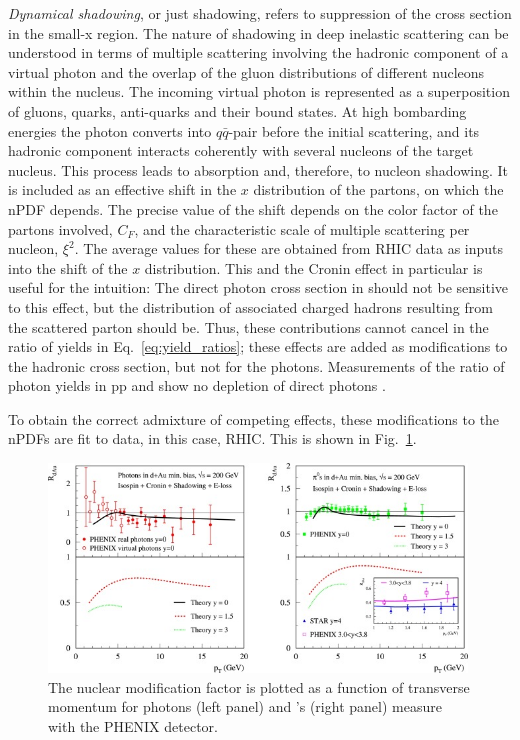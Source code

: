 {\textit{Dynamical shadowing}, or just shadowing, refers to suppression of the cross section in the small-x region. The nature of shadowing in deep inelastic scattering can be understood in terms of multiple scattering involving the hadronic component of a virtual photon and the overlap of the gluon distributions of different nucleons within the nucleus. The incoming virtual photon is represented as a superposition of gluons, quarks, anti-quarks and their bound states. At high bombarding energies the photon converts into $q\bar{q}$-pair before the initial scattering, and its hadronic component interacts coherently with several nucleons of the target nucleus. This process leads to absorption and, therefore, to nucleon shadowing\cite{Tywoniuk2007}. It is included as an effective shift in the $x$ distribution of the partons, on which the nPDF depends. The precise value of the shift depends on the color factor of the partons involved, $C_F$, and the characteristic scale of multiple scattering per nucleon, $\xi^2$. The average values for these are obtained from RHIC data as inputs into the shift of the $x$ distribution\cite{Kang2012}.
This and the Cronin effect in particular is useful for the intuition: The direct photon cross section in \pPb should not be sensitive to this effect, but the distribution of associated charged hadrons resulting from the scattered parton should be. Thus, these contributions cannot cancel in the ratio of yields in Eq.~\ref{eq:yield_ratios}; these effects are added as modifications to the hadronic cross section, but not for the photons. Measurements of the ratio of photon yields in pp and \pPb show no depletion of direct photons \cite{Masson2019}.

To obtain the correct admixture of competing effects, these modifications to the nPDFs are fit to data, in this case, RHIC. This is shown in Fig.~\ref{fig:CNM_calc}. 

  \begin{figure}[htpb]
    \centering
    \includegraphics[width=0.99\textwidth]{CNM_cal.jpg}
    \caption{The nuclear modification factor is plotted as a function of transverse momentum for photons (left panel) and \pizero's (right panel) measure with the PHENIX detector.\cite{Kang2012}}
    \label{fig:CNM_calc}
  \end{figure}

}
